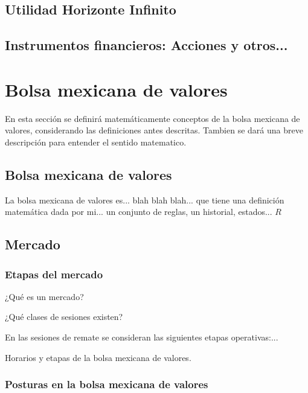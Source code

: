    	\section{Utilidad Horizonte Infinito}
    
    \section{Instrumentos financieros: Acciones y otros...}
    
\chapter{Bolsa mexicana de valores}
    En esta sección se definirá matemáticamente conceptos de la bolsa mexicana de valores, considerando las definiciones antes descritas. Tambien se dará una breve descripción para entender el sentido matematico.
    
    \section{ Bolsa mexicana de valores }
        
        La bolsa mexicana de valores es... blah blah blah... que tiene una definición matemática dada por mi... un conjunto de reglas, un historial, estados... $R$
       
    \section{ Mercado }
    
        \subsection{ Etapas del mercado }
        
        ¿Qué es un mercado?
        
        ¿Qué clases de sesiones existen?
        
        En las sesiones de remate se consideran las siguientes etapas operativas:...
       
        Horarios y etapas de la bolsa mexicana de valores.         
                
        \subsection{ Posturas en la bolsa mexicana de valores }   
        
